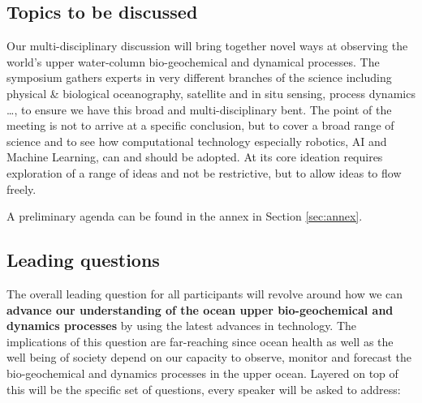 \subsection{Topics to be discussed}

Our multi-disciplinary discussion will bring together novel ways at
observing the world’s upper water-column bio-geochemical and dynamical
processes. The symposium gathers experts in very different branches of
the science including physical \& biological oceanography, satellite
and in situ sensing, process dynamics \ldots, to ensure we have this
broad and multi-disciplinary bent. The point of the meeting is not to
arrive at a specific conclusion, but to cover a broad range of science
and to see how computational technology especially robotics, AI and
Machine Learning, can and should be adopted. At its core ideation
requires exploration of a range of ideas and not be restrictive, but
to allow ideas to flow freely. 

A preliminary agenda can be found in the annex in Section \ref{sec:annex}.

\subsection{Leading questions}

The overall leading question for all participants will revolve around
how we can \textbf{advance our understanding of the ocean upper
  bio-geochemical and dynamics processes} by using the latest advances
in technology. The implications of this question are far-reaching since
ocean health as well as the well being of society depend on our capacity
to observe, monitor and forecast the bio-geochemical and dynamics
processes in the upper ocean. Layered on top of this will be the
specific set of questions, every speaker will be asked to address:

